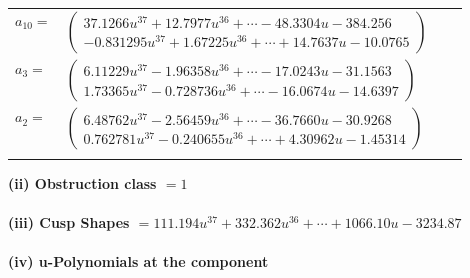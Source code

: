 \documentclass[1p]{elsarticle_modified}
\theoremstyle{definition}
\begin{document}
\begin{tabular}{m{7pt} m{180pt} m{7pt} m{180pt} }
\flushright $a_{10}=$&$\begin{pmatrix}37.1266 u^{37}+12.7977 u^{36}+\cdots-48.3304 u-384.256\\-0.831295 u^{37}+1.67225 u^{36}+\cdots+14.7637 u-10.0765\end{pmatrix}$ \\
\flushright $a_{3}=$&$\begin{pmatrix}6.11229 u^{37}-1.96358 u^{36}+\cdots-17.0243 u-31.1563\\1.73365 u^{37}-0.728736 u^{36}+\cdots-16.0674 u-14.6397\end{pmatrix}$ \\
\flushright $a_{2}=$&$\begin{pmatrix}6.48762 u^{37}-2.56459 u^{36}+\cdots-36.7660 u-30.9268\\0.762781 u^{37}-0.240655 u^{36}+\cdots+4.30962 u-1.45314\end{pmatrix}$\\&\end{tabular}
\flushleft \textbf{(ii) Obstruction class $= 1$}\\~\\
\flushleft \textbf{(iii) Cusp Shapes $= 111.194 u^{37}+332.362 u^{36}+\cdots+1066.10 u-3234.87$}\\~\\
\newpage\renewcommand{\arraystretch}{1}
\flushleft \textbf{(iv) u-Polynomials at the component}\newline \\
\end{document}

